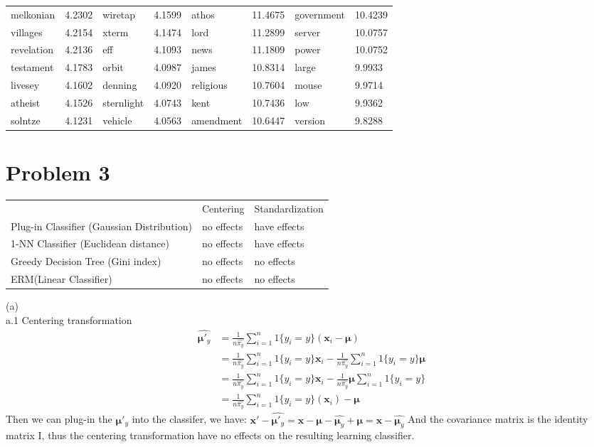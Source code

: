 \documentclass[twoside,11pt]{homework}
\begin{document}
\begin{table}[h]
\begin{tabular}{llllllll}
melkonian  & 4.2302 & wiretap     & 4.1599 & athos      & 11.4675 & government & 10.4239 \\
villages   & 4.2154 & xterm       & 4.1474 & lord       & 11.2899 & server     & 10.0757 \\
revelation & 4.2136 & eff         & 4.1093 & news       & 11.1809 & power      & 10.0752 \\
testament  & 4.1783 & orbit       & 4.0987 & james      & 10.8314 & large      & 9.9933  \\
livesey    & 4.1602 & denning     & 4.0920 & religious  & 10.7604 & mouse      & 9.9714  \\
atheist    & 4.1526 & sternlight  & 4.0743 & kent       & 10.7436 & low        & 9.9362  \\
solntze    & 4.1231 & vehicle     & 4.0563 & amendment  & 10.6447 & version    & 9.8288  \\
\end{tabular}
\end{table}


\section*{Problem 3}
\begin{table}[h]
\begin{tabular}{lll}
                                           & Centering  & Standardization \\
Plug-in Classifier (Gaussian Distribution) & no effects & have effects    \\
1-NN Classifier (Euclidean distance)       & no effects & have effects    \\
Greedy Decision Tree (Gini index)          & no effects & no effects      \\
ERM(Linear Classifier)                     & no effects & no effects     
\end{tabular}
\end{table}


(a)\\
a.1 Centering transformation
\begin{align*}
\hat{\pmb\mu'_{y}} &= \frac{1}{n\hat{\pi_{y}}}   \sum_{i=1}^n 1\{ {{y}_{i} = y}\}(\pmb{x}_{i} - \pmb\mu) \\
&=   \frac{1}{n\hat{\pi_{y}}}   \sum_{i=1}^n 1\{ {{y}_{i} = y}\}\pmb{x}_{i} -  \frac{1}{n\hat{\pi_{y}}}   \sum_{i=1}^n 1\{ {{y}_{i} = y}\}\pmb\mu\\
&=  \frac{1}{n\hat{\pi_{y}}}  \sum_{i=1}^n 1\{ {{y}_{i} = y}\}\pmb{x}_{i} -  \frac{1}{n\hat{\pi_{y}}} \pmb\mu\sum_{i=1}^n 1\{ {{y}_{i} = y}\}\\
&=   \frac{1}{n\hat{\pi_{y}}}  \sum_{i=1}^n 1\{ {{y}_{i} = y}\}(\pmb{x}_{i}) -    \pmb\mu
\end{align*}
Then we can plug-in the $\pmb\mu'_{y}$  into the classifer, we have:
$\pmb x' - \hat{\pmb\mu'_{y}}  = \pmb{x}- \pmb\mu - \hat{\pmb\mu_{y}} + \pmb\mu = \pmb{x} - \hat{\pmb\mu_{y}} $
 And the covariance matrix is the identity matrix \pmb I, thus the centering transformation have no effects on the resulting learning classifier.\\
 
\end{document}
